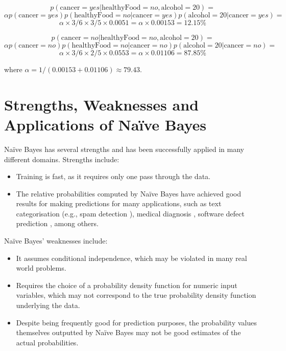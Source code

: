 \[ p(\text{cancer} = \textit{yes} | \text{healthyFood} = \textit{no}, \text{alcohol} = 20) = \]
\[ \alpha p(\text{cancer} = \textit{yes}) p(\text{healthyFood} = \textit{no} | \text{cancer} = \textit{yes}) p(\text{alcohol} = 20 | \text{cancer} = \textit{yes}) = \]
\[ \alpha \times 3/6 \times 3/5 \times 0.0051 = \alpha \times 0.00153 = 12.15\%\]

\vspace{0.5cm}
\[ p(\text{cancer} = \textit{no} | \text{healthyFood} = \textit{no}, \text{alcohol} = 20) = \]
\[ \alpha p(\text{cancer} = \textit{no}) p(\text{healthyFood} = \textit{no} | \text{cancer} = \textit{no}) p(\text{alcohol} = 20 | \text{cancer} = \textit{no}) = \]
\[ \alpha \times 3/6 \times 2/5 \times 0.0553 = \alpha \times 0.01106 = 87.85\%\]

\vspace{0.5cm}
\noindent where $\alpha = 1 / (0.00153 + 0.01106) \approx 79.43$.

\section{Strengths, Weaknesses and Applications of Na\"{i}ve Bayes}

Na\"{i}ve Bayes has several strengths and has been successfully applied in many different domains. Strengths include:
\begin{itemize}
\item Training is fast, as it requires only one pass through the data.
\item The relative probabilities computed by Na\"{i}ve Bayes have achieved good results for making predictions for many applications, such as text categorisation (e.g., spam detection \cite{Spam}), medical diagnosis \cite{MedicalDiagnosis}, software defect prediction \cite{SDP}, among others.
\end{itemize}

\noindent Na\"{i}ve Bayes' weaknesses include:
\begin{itemize}
\item It assumes conditional independence, which may be violated in many real world problems. 
\item Requires the choice of a probability density function for numeric input variables, which may not correspond to the true probability density function underlying the data.
\item Despite being frequently good for prediction purposes, the probability values themselves outputted by Na\"ive Bayes may not be good estimates of the actual probabilities.
\end{itemize}

